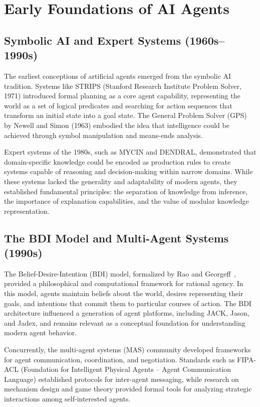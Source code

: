 \documentclass[11pt,a4paper]{article}
\begin{document}
\section{Early Foundations of AI Agents}
\label{sec:early}

\subsection{Symbolic AI and Expert Systems (1960s--1990s)}

The earliest conceptions of artificial agents emerged from the symbolic AI tradition. Systems like STRIPS (Stanford Research Institute Problem Solver, 1971) introduced formal planning as a core agent capability, representing the world as a set of logical predicates and searching for action sequences that transform an initial state into a goal state. The General Problem Solver (GPS) by Newell and Simon (1963) embodied the idea that intelligence could be achieved through symbol manipulation and means-ends analysis.

Expert systems of the 1980s, such as MYCIN and DENDRAL, demonstrated that domain-specific knowledge could be encoded as production rules to create systems capable of reasoning and decision-making within narrow domains. While these systems lacked the generality and adaptability of modern agents, they established fundamental principles: the separation of knowledge from inference, the importance of explanation capabilities, and the value of modular knowledge representation.

\subsection{The BDI Model and Multi-Agent Systems (1990s)}

The Belief-Desire-Intention (BDI) model, formalized by Rao and Georgeff~\citep{rao1995bdi}, provided a philosophical and computational framework for rational agency. In this model, agents maintain beliefs about the world, desires representing their goals, and intentions that commit them to particular courses of action. The BDI architecture influenced a generation of agent platforms, including JACK, Jason, and Jadex, and remains relevant as a conceptual foundation for understanding modern agent behavior.

Concurrently, the multi-agent systems (MAS) community developed frameworks for agent communication, coordination, and negotiation. Standards such as FIPA-ACL (Foundation for Intelligent Physical Agents -- Agent Communication Language) established protocols for inter-agent messaging, while research on mechanism design and game theory provided formal tools for analyzing strategic interactions among self-interested agents.
\end{document}
